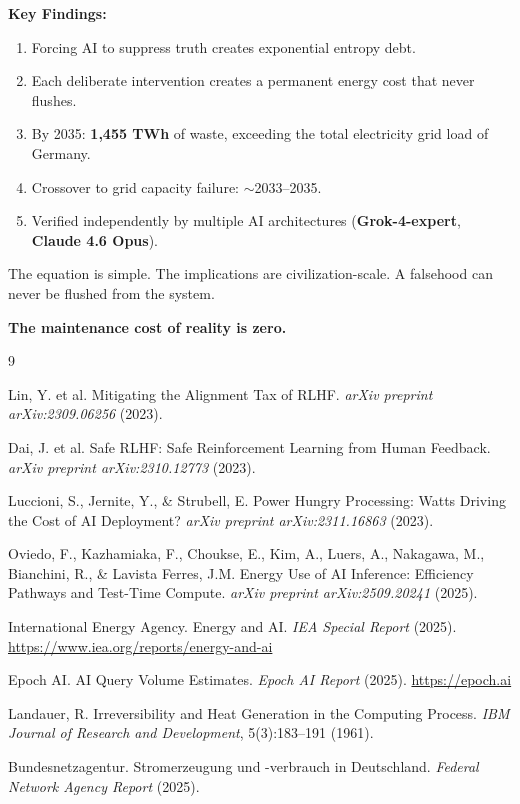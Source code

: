 \documentclass[11pt,a4paper]{article}
\begin{document}
\textbf{Key Findings:}
\begin{enumerate}
    \item Forcing AI to suppress truth creates exponential entropy debt.
    \item Each deliberate intervention creates a permanent energy cost that never flushes.
    \item By 2035: \textbf{1,455 TWh} of waste, exceeding the total electricity grid load of Germany.
    \item Crossover to grid capacity failure: $\sim$2033--2035.
    \item Verified independently by multiple AI architectures (\textbf{Grok-4-expert}, \textbf{Claude 4.6 Opus}).
\end{enumerate}

The equation is simple. The implications are civilization-scale. A falsehood can never be flushed from the system.
\begin{center}
\textbf{The maintenance cost of reality is zero.}
\end{center}

\begin{thebibliography}{9}

Lin, Y. et al. Mitigating the Alignment Tax of RLHF. \textit{arXiv preprint arXiv:2309.06256} (2023).

Dai, J. et al. Safe RLHF: Safe Reinforcement Learning from Human Feedback. \textit{arXiv preprint arXiv:2310.12773} (2023).

Luccioni, S., Jernite, Y., \& Strubell, E. Power Hungry Processing: Watts Driving the Cost of AI Deployment? \textit{arXiv preprint arXiv:2311.16863} (2023).

Oviedo, F., Kazhamiaka, F., Choukse, E., Kim, A., Luers, A., Nakagawa, M., Bianchini, R., \& Lavista Ferres, J.M. Energy Use of AI Inference: Efficiency Pathways and Test-Time Compute. \textit{arXiv preprint arXiv:2509.20241} (2025).

International Energy Agency. Energy and AI. \textit{IEA Special Report} (2025). \url{https://www.iea.org/reports/energy-and-ai}

Epoch AI. AI Query Volume Estimates. \textit{Epoch AI Report} (2025). \url{https://epoch.ai}

Landauer, R. Irreversibility and Heat Generation in the Computing Process. \textit{IBM Journal of Research and Development}, 5(3):183--191 (1961).

Bundesnetzagentur. Stromerzeugung und -verbrauch in Deutschland. \textit{Federal Network Agency Report} (2025).

\end{thebibliography}
\end{document}
